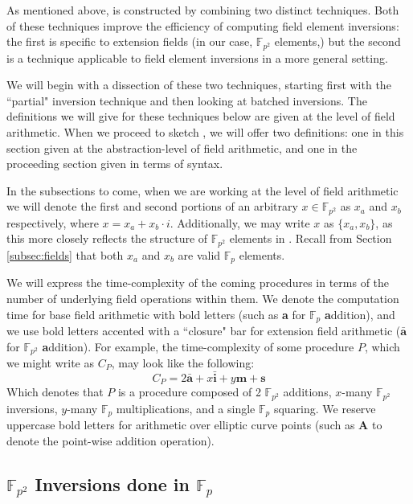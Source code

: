 As mentioned above,  is constructed by combining two distinct techniques. Both of these techniques improve the efficiency of computing field element inversions: the first is specific to extension fields (in our case, $\mathbb{F}_{p^{2}}$ elements,) but the second is a technique applicable to field element inversions in a more general setting.

We will begin with a dissection of these two techniques, starting first with the ``partial" inversion technique and then looking at batched inversions. The definitions we will give for these techniques below are given at the level of field arithmetic. When we proceed to sketch , we will offer two definitions: one in this section given at the abstraction-level of field arithmetic, and one in the proceeding section given in terms of \sidh syntax.

In the subsections to come, when we are working at the level of field arithmetic we will denote the first and second portions of an arbitrary $x \in \mathbb{F}_{p^{2}}$ as $x_{a}$ and $x_{b}$ respectively, where $x = x_{a} + x_{b}\cdot i$. Additionally, we may write $x$ as $\{x_{a}, x_{b}\}$, as this more closely reflects the structure of $\mathbb{F}_{p^{2}}$ elements in \sidh. Recall from Section \ref{subsec:fields} that both $x_{a}$ and $x_{b}$ are valid $\mathbb{F}_{p}$ elements. 

We will express the time-complexity of the coming procedures in terms of the number of underlying field operations within them. We denote the computation time for base field arithmetic with bold letters (such as \textbf{a} for $\mathbb{F}_p$ \textbf{a}ddition), and we use bold letters accented with a ``closure" bar for extension field arithmetic ($\bar{\textbf{a}}$ for $\mathbb{F}_{p^2}$ \textbf{a}ddition). For example, the time-complexity of some procedure $P$, which we might write as $C_{P}$, may look like the following:
$$
C_{P} = 2\bar{\textbf{a}} + x\bar{\textbf{i}} + y\textbf{m} + \textbf{s}
$$
Which denotes that $P$ is a procedure composed of 2 $\mathbb{F}_{p^{2}}$ additions, $x$-many $\mathbb{F}_{p^{2}}$ inversions, $y$-many $\mathbb{F}_{p}$ multiplications, and a single $\mathbb{F}_{p}$ squaring. We reserve uppercase bold letters for arithmetic over elliptic curve points (such as \textbf{A} to denote the point-wise addition operation).

\subsection{$\mathbb{F}_{p^{2}}$ Inversions done in $\mathbb{F}_{p}$}

